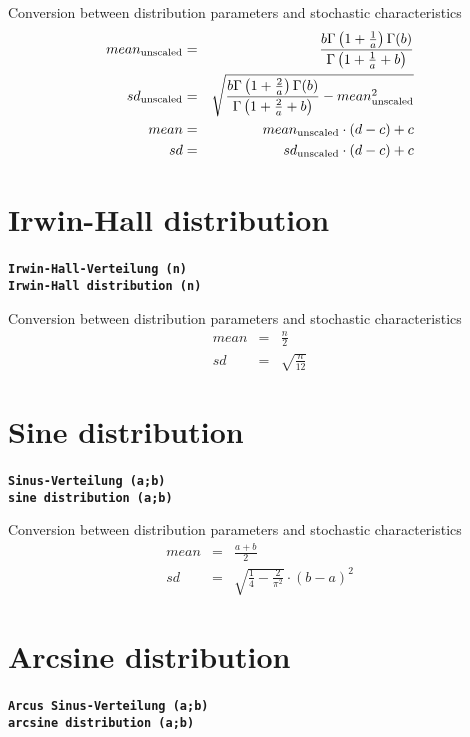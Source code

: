 \documentclass{svmono}
\def\cm#1{\textbf{\texttt{#1}}}
\begin{document}
Conversion between distribution parameters and stochastic characteristics
\begin{eqnarray*}
mean_{\rm unscaled}&=&\frac{b\Gamma\left(1+\frac{1}{a}\right)\Gamma(b)}{\Gamma\left(1+\frac{1}{a}+b\right)}\\
sd_{\rm unscaled}&=&\sqrt{\frac{b\Gamma\left(1+\frac{2}{a}\right)\Gamma(b)}{\Gamma\left(1+\frac{2}{a}+b\right)}-mean_{\rm unscaled}^2}\\
mean&=&mean_{\rm unscaled}\cdot(d-c)+c\\
sd&=&sd_{\rm unscaled}\cdot(d-c)+c\\
\end{eqnarray*}





\section*{Irwin-Hall distribution}
\cm{Irwin-Hall-Verteilung (n)}~\\
\cm{Irwin-Hall distribution (n)}

Conversion between distribution parameters and stochastic characteristics
\begin{eqnarray*}
mean&=&\frac{n}{2}\\
sd&=&\sqrt{\frac{n}{12}}
\end{eqnarray*}





\section*{Sine distribution}
\cm{Sinus-Verteilung (a;b)}~\\
\cm{sine distribution (a;b)}

Conversion between distribution parameters and stochastic characteristics
\begin{eqnarray*}
mean&=&\frac{a+b}{2}\\
sd&=&\sqrt{\frac{1}{4}-\frac{2}{\pi^2}}\cdot(b-a)^2
\end{eqnarray*}





\section*{Arcsine distribution}
\cm{Arcus Sinus-Verteilung (a;b)}~\\
\cm{arcsine distribution (a;b)}
\end{document}
